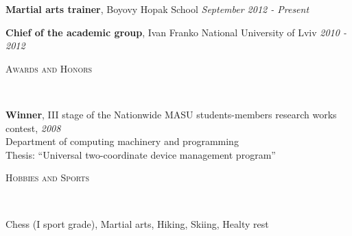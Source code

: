 \documentclass{article}
\newenvironment{changemargin}[2]{%
  \begin{list}{}{%
    \setlength{\topsep}{0pt}%
    \setlength{\leftmargin}{#1}%
    \setlength{\rightmargin}{#2}%
    \setlength{\listparindent}{\parindent}%
    \setlength{\itemindent}{\parindent}%
    \setlength{\parsep}{\parskip}%
  }%
  \item[]}{\end{list}
}
\newcommand{\lineover}{
  \begin{changemargin}{-1mm}{-1mm}
    \vspace*{-8pt}
    \hrulefill \\
    \vspace*{-2pt}
  \end{changemargin}
}
\newcommand{\header}[1]{
  \begin{changemargin}{-12mm}{-12mm}
    \scshape{#1}\\
    \lineover
  \end{changemargin}
}
\newenvironment{body}{
  \vspace*{-16pt}
  \begin{changemargin}{-6mm}{-12mm}
}{
  \end{changemargin}
}
\begin{document}
\begin{body}
  \vspace{14pt}
  \textbf{Martial arts trainer}, Boyovy Hopak School \hfill {} \emph{September 2012 - Present}\\
  \medskip

  \textbf{Chief of the academic group}, Ivan Franko National University of Lviv \hfill{} \emph{2010 - 2012}\\
\end{body}

\smallskip

\header{Awards and Honors}

\begin{body}
  \vspace{14pt}
  \textbf{Winner}, III stage of the Nationwide MASU students-members research works contest, \hfill{} \emph{2008}\\
  Department of computing machinery and programming\\
  Thesis: ``Universal two-coordinate device management program''\\

\end{body}

\smallskip

\header{Hobbies and Sports}
  
\begin{body}
  \vspace{14pt}
  Chess (I sport grade), Martial arts, Hiking, Skiing, Healty rest

\end{body}
\end{document}
